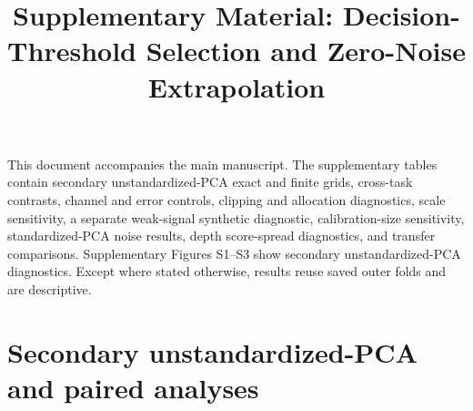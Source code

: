 \documentclass[10pt]{article}
\title{Supplementary Material: Decision-Threshold Selection and Zero-Noise Extrapolation}
\date{}
\begin{document}
\maketitle
\renewcommand{\thetable}{S\arabic{table}}
This document accompanies the main manuscript. The supplementary tables contain secondary unstandardized-PCA exact and finite grids, cross-task contrasts, channel and error controls, clipping and allocation diagnostics, scale sensitivity, a separate weak-signal synthetic diagnostic, calibration-size sensitivity, standardized-PCA noise results, depth score-spread diagnostics, and transfer comparisons. Supplementary Figures S1--S3 show secondary unstandardized-PCA diagnostics. Except where stated otherwise, results reuse saved outer folds and are descriptive.

\section*{Secondary unstandardized-PCA and paired analyses}

\begin{table}[H]
\centering
\caption{Secondary unstandardized-PCA WDBC exact-expectation results (mean across saved model runs).}
\label{tab:exact}
\scriptsize
\setlength{\tabcolsep}{2.2pt}
\end{table}
\end{document}
